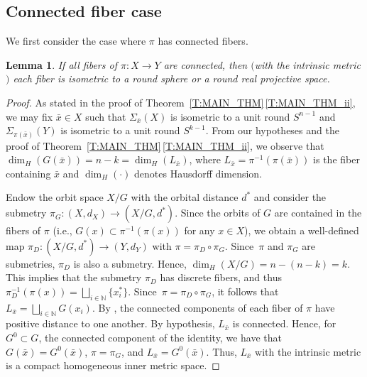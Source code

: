 \documentclass[pdftex]{sigma}
\numberwithin{equation}{section}
\newtheorem{lem}[thm]{Lemma}
\theoremstyle{definition}
\newcommand{\N}{\mathbb{N}} %
\begin{document}
\subsection*{Connected fiber case} We first consider the case where $\pi$ has connected fibers.

\begin{lem}\label{L: fibers are homogeneous Riemannian manifolds}
If all fibers of $\pi\colon X\to Y$ are connected, then $($with the intrinsic metric$)$ each fiber is isometric to a round sphere or a round real projective space.
\end{lem}

\begin{proof}

As stated in the proof of Theorem~\ref{T:MAIN_THM}\,\ref{T:MAIN_THM_ii}, we may fix $\bar{x}\in X$ such that $\Sigma_{\bar{x}}(X)$ is isometric to a unit round $S^{n-1}$ and $\Sigma_{\pi(\bar{x})}(Y)$ is isometric to a unit round $S^{k-1}$.
From our hypotheses and the proof of Theorem~\ref{T:MAIN_THM}\,\ref{T:MAIN_THM_ii}, we observe that
$
\dim_H(G(\bar{x})) = n-k = \dim_H(L_{\bar{x}})$,
where $L_{\bar{x}} = \pi^{-1}(\pi(\bar{x}))$ is the fiber containing $\bar{x}$ and $\dim_H(\cdot)$ denotes Hausdorff dimension.

Endow the orbit space $X/G$ with the orbital distance $d^\ast$ and consider the submetry
$
\pi_G\colon (X,\allowbreak d_X)\to (X/G,d^\ast)$.
Since the orbits of $G$ are contained in the fibers of $\pi$ \big(i.e., $G(x)\subset \pi^{-1}(\pi(x))$ for any $x\in X$\big), we obtain a well-defined map
$\pi_D\colon (X/G,d^\ast)\to (Y,d_Y)$
with $\pi = \pi_D\circ \pi_G$. Since~$\pi$ and $\pi_G$ are submetries, $\pi_D$ is also a submetry.
Hence,
$\dim_H(X/G) = n-(n-k) = k$.
This implies that the submetry $\pi_D$ has discrete fibers, and thus $\pi_D^{-1}(\pi(x))= \bigsqcup_{i\in \N} \{x^\ast_i\}$. Since~${\pi = \pi_D\circ \pi_G}$, it follows that
$
L_{\bar{x}} = \bigsqcup_{i\in \N} G(x_{i})$.
By \cite[Theorem 7.2]{Lytchak}, the connected components of each fiber of $\pi$ have positive distance to one another.
By hypothesis, $L_{\bar{x}}$ is connected. Hence, for $G^0\subset G$, the connected component of the identity, we have that $G(\bar{x})=G^0(\bar{x})$, $\pi=\pi_G$, and
$
L_{\bar{x}}=G^0(\bar{x})$.
Thus, $L_{\bar{x}}$ with the intrinsic metric is a compact homogeneous inner metric space.


\end{proof}
\end{document}
